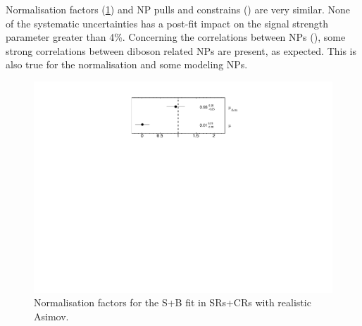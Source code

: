 Normalisation factors (\cref{fig:stat_smt:tzc:splusb:crsr:norm}) and NP
pulls and constrains 
() 
are very similar. 
None of the systematic uncertainties has a post-fit impact on the signal strength parameter greater than 4\%.
Concerning the correlations between NPs
(), some strong correlations
between diboson related NPs are present, as expected. This is also
true for the \ttbar normalisation and some \ttbar modeling NPs. 

\begin{figure}[htbp]
	\centering
	\includegraphics[width=.42\textwidth]{Appendices/AP8/figures/SPLUSB_CRSR_UsingSMTFullSys/NormFactors}
	\caption{Normalisation factors for the S+B \tZc fit in SRs+CRs with realistic Asimov.}%
	\label{fig:stat_smt:tzc:splusb:crsr:norm}
\end{figure}
\restoregeometry

